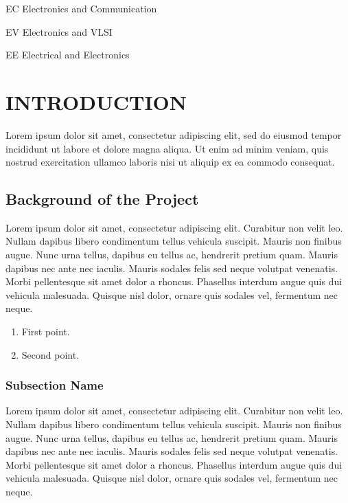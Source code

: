 \documentclass[12pt,a4paper]{report}
\begin{document}
\begin{abbrv}

\item[EC ]			Electronics and Communication
\item[EV ]			Electronics and VLSI
\item[EE ]			Electrical and Electronics 
\end{abbrv}


\newpage
\pagestyle{fancy}
\headheight 26pt
\renewcommand{\footrulewidth}{1.2pt}
\renewcommand{\headrulewidth}{1.2pt}
\rhead[OC]{\rmfamily \small \nouppercase \leftmark}
\cfoot{\thepage}


\newpage
{}


\newpage
{}

\chapter{INTRODUCTION}
\thispagestyle{empty}
Lorem ipsum dolor sit amet, consectetur adipiscing elit, sed do eiusmod tempor incididunt ut labore et dolore magna aliqua. Ut enim ad minim veniam, quis nostrud exercitation ullamco laboris nisi ut aliquip ex ea commodo consequat.\cite{JSM} 


\section{Background of the Project}
Lorem ipsum dolor sit amet, consectetur adipiscing elit. Curabitur non velit leo. Nullam dapibus libero condimentum tellus vehicula suscipit. Mauris non finibus augue. Nunc urna tellus, dapibus eu tellus ac, hendrerit pretium quam. Mauris dapibus nec ante nec iaculis. Mauris sodales felis sed neque volutpat venenatis. Morbi pellentesque sit amet dolor a rhoncus. Phasellus interdum augue quis dui vehicula malesuada. Quisque nisl dolor, ornare quis sodales vel, fermentum nec neque. \cite{HAR}

\begin{enumerate}
\item First point.
\item Second point.
\end{enumerate}

\subsection{Subsection Name}
Lorem ipsum dolor sit amet, consectetur adipiscing elit. Curabitur non velit leo. Nullam dapibus libero condimentum tellus vehicula suscipit. Mauris non finibus augue. Nunc urna tellus, dapibus eu tellus ac, hendrerit pretium quam. Mauris dapibus nec ante nec iaculis. Mauris sodales felis sed neque volutpat venenatis. Morbi pellentesque sit amet dolor a rhoncus. Phasellus interdum augue quis dui vehicula malesuada. Quisque nisl dolor, ornare quis sodales vel, fermentum nec neque. 
\end{document}

